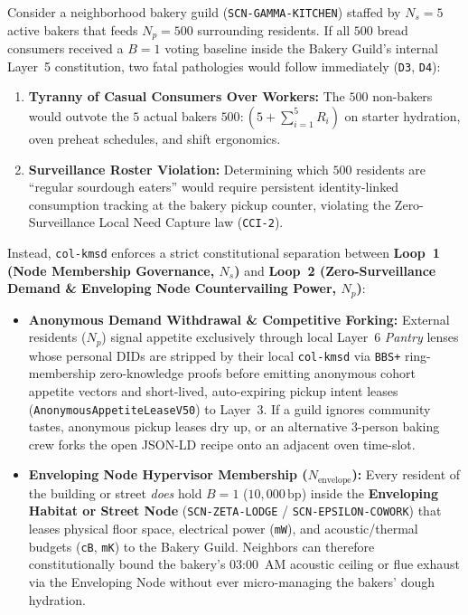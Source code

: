 Consider a neighborhood bakery guild (\texttt{SCN-GAMMA-KITCHEN}) staffed by $N_s = 5$ active
bakers that feeds $N_p = 500$ surrounding residents. If all $500$ bread consumers received a
$B = 1$ voting baseline inside the Bakery Guild's internal Layer~5 constitution, two fatal
pathologies would follow immediately (\texttt{D3}, \texttt{D4}):
\begin{enumerate}
\item \textbf{Tyranny of Casual Consumers Over Workers:} The $500$ non-bakers would outvote the
        $5$ actual bakers $500 : (5 + \sum_{i=1}^5 R_i)$ on starter hydration, oven preheat
        schedules, and shift ergonomics.
\item \textbf{Surveillance Roster Violation:} Determining which $500$ residents are ``regular
        sourdough eaters'' would require persistent identity-linked consumption tracking at the
        bakery pickup counter, violating the Zero-Surveillance Local Need Capture law (\texttt{CCI-2}).
\end{enumerate}

Instead, \texttt{col-kmsd} enforces a strict constitutional separation between \textbf{Loop~1 (Node
Membership Governance, $N_s$)} and \textbf{Loop~2 (Zero-Surveillance Demand \& Enveloping Node
Countervailing Power, $N_p$)}:
\begin{itemize}
\item \textbf{Anonymous Demand Withdrawal \& Competitive Forking:} External residents ($N_p$)
        signal appetite exclusively through local Layer~6 \textit{Pantry} lenses whose personal
        DIDs are stripped by their local \texttt{col-kmsd} via \texttt{BBS+} ring-membership
        zero-knowledge proofs before emitting anonymous cohort appetite vectors and short-lived,
        auto-expiring pickup intent leases (\texttt{AnonymousAppetiteLeaseV50}) to Layer~3. If a
        guild ignores community tastes, anonymous pickup leases dry up, or an alternative 3-person
        baking crew forks the open JSON-LD recipe onto an adjacent oven time-slot.
\item \textbf{Enveloping Node Hypervisor Membership ($N_{\mathrm{envelope}}$):} Every resident of
        the building or street \textit{does} hold $B = 1$ ($10{,}000\,\mathrm{bp}$) inside the
        \textbf{Enveloping Habitat or Street Node} (\texttt{SCN-ZETA-LODGE} /
        \texttt{SCN-EPSILON-COWORK}) that leases physical floor space, electrical power
        (\texttt{mW}), and acoustic/thermal budgets (\texttt{cB}, \texttt{mK}) to the Bakery
        Guild. Neighbors can therefore constitutionally bound the bakery's 03:00~AM acoustic
        ceiling or flue exhaust via the Enveloping Node without ever micro-managing the bakers'
        dough hydration.
\end{itemize}

